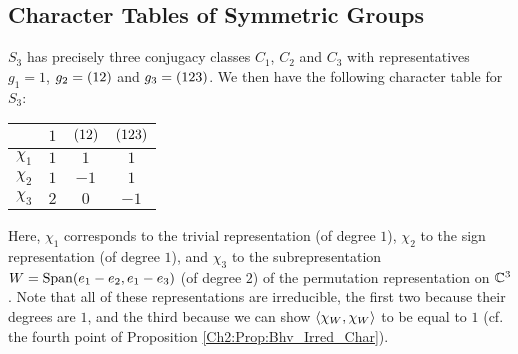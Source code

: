 \subsection{Character Tables of Symmetric Groups}

\begin{boxexample}[$S_3$]
    $S_3$ has precisely three conjugacy classes $C_1$, $C_2$ and $C_3$ with representatives $g_1 = 1$, $g_2 = \left( 1 2 \right)$ and $g_3 = \left( 1 2 3 \right)$. We then have the following character table for $S_3$:
    \begin{table}[H]
        \centering
        \begin{tabular}{c|ccc}
            & $1$ & $\left( 12 \right)$ & $\left( 123 \right)$ \\
            \hline
            $\chi_1$ & $1$ & $1$ & $1$ \\
            $\chi_2$ & $1$ & $-1$ & $1$ \\
            $\chi_3$ & $2$ & $0$ & $-1$
        \end{tabular}
    \end{table}
    Here, $\chi_1$ corresponds to the trivial representation (of degree $1$), $\chi_2$ to the sign representation (of degree $1$), and $\chi_3$ to the subrepresentation $W = \operatorname{Span}\!\left( e_1 - e_2, e_1 - e_3 \right)$ (of degree $2$) of the permutation representation on $\mathbb{C}^3$. Note that all of these representations are irreducible, the first two because their degrees are $1$, and the third because we can show $\left\langle \chi_W, \chi_W \right\rangle$ to be equal to $1$ (cf. the fourth point of Proposition \ref{Ch2:Prop:Bhv_Irred_Char}).
\end{boxexample}


